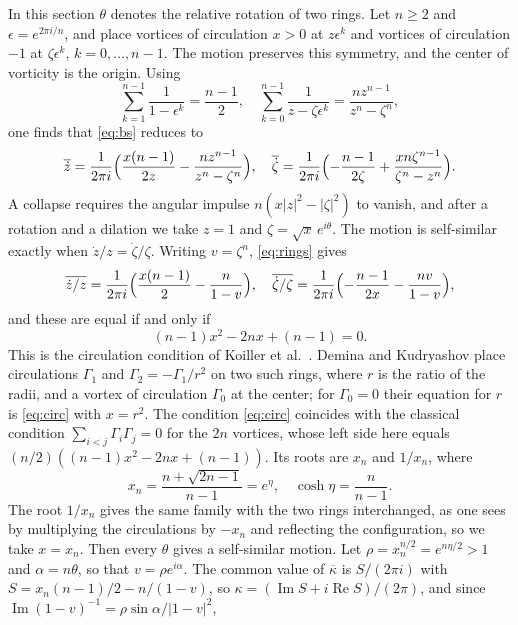 \documentclass[11pt]{article}
\theoremstyle{definition}
\newcommand{\re}{\operatorname{Re}}
\newcommand{\im}{\operatorname{Im}}
\begin{document}
In this section $\theta$ denotes the relative rotation of two rings. Let $n \ge 2$ and $\epsilon = e^{2\pi i/n}$, and place vortices of circulation $x > 0$ at $z\epsilon^k$ and vortices of circulation $-1$ at $\zeta\epsilon^k$, $k = 0, \dots, n - 1$. The motion preserves this symmetry, and the center of vorticity is the origin. Using
\[
  \sum_{k=1}^{n-1} \frac{1}{1 - \epsilon^k} = \frac{n - 1}{2}, \quad
  \sum_{k=0}^{n-1} \frac{1}{z - \zeta\epsilon^k} = \frac{n z^{n-1}}{z^n - \zeta^n},
\]
one finds that \eqref{eq:bs} reduces to \cite[Eq.~(3)]{aref1982}
\begin{equation}\label{eq:rings}
  \overline{\dot z} = \frac{1}{2\pi i}\Bigl(\frac{x(n - 1)}{2z} - \frac{n z^{n-1}}{z^n - \zeta^n}\Bigr), \quad
  \overline{\dot\zeta} = \frac{1}{2\pi i}\Bigl(-\frac{n - 1}{2\zeta} + \frac{x n \zeta^{n-1}}{\zeta^n - z^n}\Bigr).
\end{equation}
A collapse requires the angular impulse $n(x|z|^2 - |\zeta|^2)$ to vanish, and after a rotation and a dilation we take $z = 1$ and $\zeta = \sqrt{x}\, e^{i\theta}$. The motion is self-similar exactly when $\dot z/z = \dot\zeta/\zeta$. Writing $v = \zeta^n$, \eqref{eq:rings} gives
\[
  \overline{\dot z/z} = \frac{1}{2\pi i}\Bigl(\frac{x(n - 1)}{2} - \frac{n}{1 - v}\Bigr), \quad
  \overline{\dot\zeta/\zeta} = \frac{1}{2\pi i}\Bigl(-\frac{n - 1}{2x} - \frac{n v}{1 - v}\Bigr),
\]
and these are equal if and only if
\begin{equation}\label{eq:circ}
  (n - 1)x^2 - 2nx + (n - 1) = 0.
\end{equation}
This is the circulation condition of Koiller et al.\ \cite[Sect.~11]{koiller1985}. Demina and Kudryashov \cite[Sect.~3]{dk2014} place circulations $\Gamma_1$ and $\Gamma_2 = -\Gamma_1/r^2$ on two such rings, where $r$ is the ratio of the radii, and a vortex of circulation $\Gamma_0$ at the center; for $\Gamma_0 = 0$ their equation for $r$ \cite[Eq.~(37)]{dk2014} is \eqref{eq:circ} with $x = r^2$. The condition \eqref{eq:circ} coincides with the classical condition $\sum_{i<j} \Gamma_i \Gamma_j = 0$ for the $2n$ vortices, whose left side here equals $(n/2)((n - 1)x^2 - 2nx + (n - 1))$. Its roots are $x_n$ and $1/x_n$, where
\[
  x_n = \frac{n + \sqrt{2n - 1}}{n - 1} = e^\eta, \quad \cosh\eta = \frac{n}{n - 1}.
\]
The root $1/x_n$ gives the same family with the two rings interchanged, as one sees by multiplying the circulations by $-x_n$ and reflecting the configuration, so we take $x = x_n$. Then every $\theta$ gives a self-similar motion. Let $\rho = x_n^{n/2} = e^{n\eta/2} > 1$ and $\alpha = n\theta$, so that $v = \rho e^{i\alpha}$. The common value of $\overline{\kappa}$ is $S/(2\pi i)$ with $S = x_n(n - 1)/2 - n/(1 - v)$, so $\kappa = (\im S + i\re S)/(2\pi)$, and since $\im(1 - v)^{-1} = \rho\sin\alpha/|1 - v|^2$,
\end{document}

